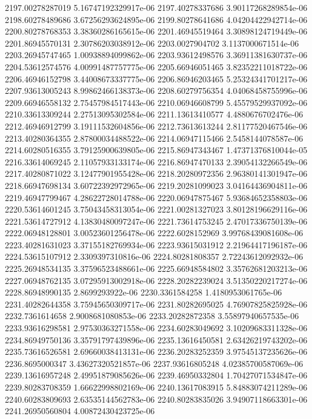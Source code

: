 {2197.00278287019 5.16747192329917e-06
2197.40278337686 3.90117268289854e-06
2198.60278489686 3.67256293624895e-06
2199.80278641686 4.04204422942714e-06
2200.80278768353 3.38360286165615e-06
2201.46945519464 3.30898124719449e-06
2201.86945570131 2.30786203038912e-06
2203.0027904702 3.1137000671514e-06
2203.26945747465 1.00938894099862e-06
2203.93612498576 3.36911381630737e-06
2204.53612574576 4.00991487757775e-06
2205.66946051465 3.82352211018722e-06
2206.46946152798 3.44008673337775e-06
2206.86946203465 5.25324341701217e-06
2207.93613005243 8.99862466138373e-06
2208.60279756354 4.04068458755996e-06
2209.66946558132 2.75457984517443e-06
2210.06946608799 5.45579529937092e-06
2210.33613309244 2.27513095302584e-06
2211.13613410577 4.4880676702476e-06
2212.46946912799 3.19111532604856e-06
2212.73613613244 2.81177520467546e-06
2213.40280364355 2.87800034488522e-06
2214.06947115466 2.5458144078587e-06
2214.60280516355 3.79125900639805e-06
2215.86947343467 1.47371376810044e-05
2216.33614069245 2.11057933133174e-06
2216.86947470133 2.39054132266549e-06
2217.40280871022 3.12477901955428e-06
2218.20280972356 2.96380141301947e-06
2218.66947698134 3.60722392972965e-06
2219.20281099023 3.04164436904811e-06
2219.46947799467 4.28622728014788e-06
2220.06947875467 5.93684652358803e-06
2220.53614601245 3.75043458313054e-06
2221.00281327023 3.80128196629116e-06
2221.53614727912 4.13830480097247e-06
2221.73614753245 2.47017336750139e-06
2222.06948128801 3.00523601256478e-06
2222.6028152969 3.99768439081608e-06
2223.40281631023 3.37155182769934e-06
2223.93615031912 2.21964417196187e-06
2224.53615107912 2.3309397310816e-06
2224.80281808357 2.72243612092932e-06
2225.26948534135 3.37596523488661e-06
2225.66948584802 3.35762681203213e-06
2227.06948762135 3.07295913002918e-06
2228.20282239024 3.51350220217274e-06
2228.86948990135 2.8699293922e-06
2230.3361584258 1.4180953061765e-06
2231.40282644358 3.75945650309717e-06
2231.80282695025 4.76907825825928e-06
2232.7361614658 2.9008681080853e-06
2233.20282872358 3.55897940657535e-06
2233.93616298581 2.97530363271558e-06
2234.60283049692 3.10209683311328e-06
2234.86949750136 3.35791797439896e-06
2235.13616450581 2.63426219743202e-06
2235.73616526581 2.69660038413131e-06
2236.20283252359 3.97545137235626e-06
2236.8695000347 3.43627320521857e-06
2237.93616805248 4.02385700587069e-06
2239.13616957248 2.49951879085626e-06
2239.46950332804 1.70427071534847e-06
2239.80283708359 1.66622998802169e-06
2240.13617083915 5.84883074211289e-06
2240.60283809693 2.63535144562783e-06
2240.80283835026 3.94907118663301e-06
2241.26950560804 4.00872430423725e-06
}
